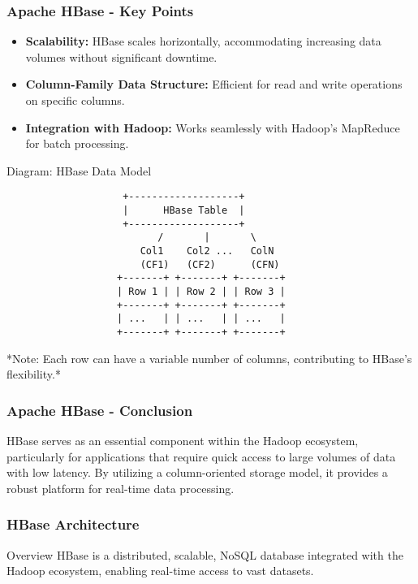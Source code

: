 \documentclass[aspectratio=169]{beamer}
\begin{document}
\begin{frame}[fragile]
  \frametitle{Apache HBase - Key Points}
  \begin{itemize}
    \item \textbf{Scalability:} HBase scales horizontally, accommodating increasing data volumes without significant downtime.
    \item \textbf{Column-Family Data Structure:} Efficient for read and write operations on specific columns.
    \item \textbf{Integration with Hadoop:} Works seamlessly with Hadoop's MapReduce for batch processing.
  \end{itemize}
  
  \begin{block}{Diagram: HBase Data Model}
    \begin{verbatim}
                    +-------------------+
                    |      HBase Table  |
                    +-------------------+
                          /       |       \
                       Col1    Col2 ...   ColN
                       (CF1)   (CF2)      (CFN)
                   +-------+ +-------+ +-------+
                   | Row 1 | | Row 2 | | Row 3 |
                   +-------+ +-------+ +-------+
                   | ...   | | ...   | | ...   |
                   +-------+ +-------+ +-------+
    \end{verbatim}
    *Note: Each row can have a variable number of columns, contributing to HBase’s flexibility.*
  \end{block}
\end{frame}

\begin{frame}[fragile]
  \frametitle{Apache HBase - Conclusion}
  HBase serves as an essential component within the Hadoop ecosystem, particularly for applications that require quick access to large volumes of data with low latency. By utilizing a column-oriented storage model, it provides a robust platform for real-time data processing.
\end{frame}

\begin{frame}[fragile]
    \frametitle{HBase Architecture}
    \begin{block}{Overview}
        HBase is a distributed, scalable, NoSQL database integrated with the Hadoop ecosystem, enabling real-time access to vast datasets.
    \end{block}
\end{frame}
\end{document}
